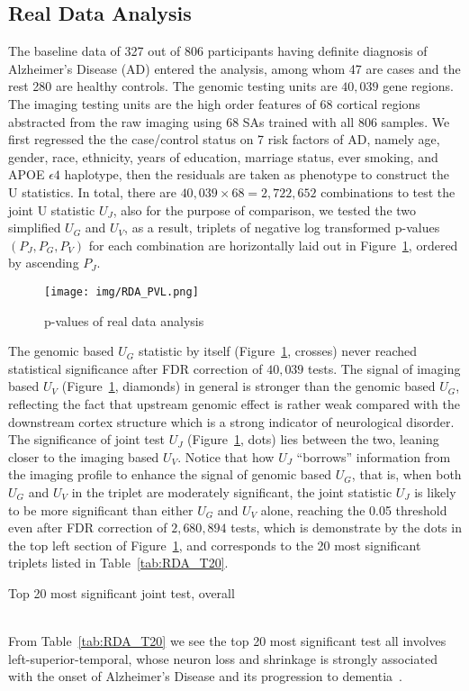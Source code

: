 \subsection{Real Data Analysis}
The baseline data of 327 out of 806 participants having definite diagnosis of Alzheimer's Disease (AD) entered the analysis, among whom 47 are cases and the rest 280 are healthy controls. The genomic testing units are $40,039$ gene regions. The imaging testing units are the high order features of 68 cortical regions abstracted from the raw imaging using 68 SAs trained with all 806 samples. We first regressed the the case/control status on 7 risk factors of AD, namely age, gender, race, ethnicity, years of education, marriage status, ever smoking, and APOE $\epsilon4$ haplotype, then the residuals are taken as phenotype to construct the U statistics. In total, there are $40,039 \times 68 = 2,722,652$ combinations to test the joint U statistic $U_J$, also for the purpose of comparison, we tested the two simplified $U_G$ and $U_V$, as a result, triplets of negative log transformed p-values $(P_J, P_G, P_V)$ for each combination are horizontally laid out in Figure~\ref{fig:RDA_PVL}, ordered by ascending $P_J$.
\begin{figure}[!htbp]
  \centering
  \texttt{[image: img/RDA\_PVL.png]}
  \caption{p-values of real data analysis}\label{fig:RDA_PVL}
\end{figure}
The genomic based $U_G$ statistic by itself (Figure~\ref{fig:RDA_PVL}, crosses) never reached statistical significance after FDR correction of $40,039$ tests. The signal of imaging based $U_V$ (Figure~\ref{fig:RDA_PVL}, diamonds) in general is stronger than the genomic based $U_G$, reflecting the fact that upstream genomic effect is rather weak compared with the downstream cortex structure which is a strong indicator of neurological disorder. The significance of joint test $U_J$ (Figure~\ref{fig:RDA_PVL}, dots) lies between the two, leaning closer to the imaging based $U_V$. Notice that how $U_J$ ``borrows'' information from the imaging profile to enhance the signal of genomic based $U_G$, that is, when both $U_G$ and $U_V$ in the triplet are moderately significant, the joint statistic $U_J$ is likely to be more significant than either $U_G$ and $U_V$ alone, reaching the 0.05 threshold even after FDR correction of $2,680,894$ tests, which is demonstrate by the dots in the top left section of Figure~\ref{fig:RDA_PVL}, and corresponds to the 20 most significant triplets listed in Table~\ref{tab:RDA_T20}.
\begin{table}[!htbp]
  \centering
  \small
  \caption{Top 20 most significant joint test, overall}\label{tab:RDA_T20}
  
\end{table} \\
From Table~\ref{tab:RDA_T20} we see the top 20 most significant test all involves left-superior-temporal, whose neuron loss and shrinkage is strongly associated with the onset of Alzheimer's Disease and its progression to dementia~\cite{AD:ST1}. 

